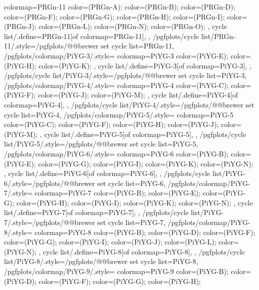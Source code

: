 {{    colormap={PRGn-11}{
      color=(PRGn-A);
      color=(PRGn-B);
      color=(PRGn-D);
      color=(PRGn-F);
      color=(PRGn-G);
      color=(PRGn-H);
      color=(PRGn-I);
      color=(PRGn-J);
      color=(PRGn-L);
      color=(PRGn-N);
      color=(PRGn-O);
    },
    cycle list/.define={PRGn-11}{[of colormap=PRGn-11]},
  },
  /pgfplots/cycle list/PRGn-11/.style={/pgfplots/@@brewer set cycle list={PRGn-11}},
  /pgfplots/colormap/PiYG-3/.style={
    colormap={PiYG-3}{
      color=(PiYG-E);
      color=(PiYG-H);
      color=(PiYG-K);
    },
    cycle list/.define={PiYG-3}{[of colormap=PiYG-3]},
  },
  /pgfplots/cycle list/PiYG-3/.style={/pgfplots/@@brewer set cycle list={PiYG-3}},
  /pgfplots/colormap/PiYG-4/.style={
    colormap={PiYG-4}{
      color=(PiYG-C);
      color=(PiYG-F);
      color=(PiYG-J);
      color=(PiYG-M);
    },
    cycle list/.define={PiYG-4}{[of colormap=PiYG-4]},
  },
  /pgfplots/cycle list/PiYG-4/.style={/pgfplots/@@brewer set cycle list={PiYG-4}},
  /pgfplots/colormap/PiYG-5/.style={
    colormap={PiYG-5}{
      color=(PiYG-C);
      color=(PiYG-F);
      color=(PiYG-H);
      color=(PiYG-J);
      color=(PiYG-M);
    },
    cycle list/.define={PiYG-5}{[of colormap=PiYG-5]},
  },
  /pgfplots/cycle list/PiYG-5/.style={/pgfplots/@@brewer set cycle list={PiYG-5}},
  /pgfplots/colormap/PiYG-6/.style={
    colormap={PiYG-6}{
      color=(PiYG-B);
      color=(PiYG-E);
      color=(PiYG-G);
      color=(PiYG-I);
      color=(PiYG-K);
      color=(PiYG-N);
    },
    cycle list/.define={PiYG-6}{[of colormap=PiYG-6]},
  },
  /pgfplots/cycle list/PiYG-6/.style={/pgfplots/@@brewer set cycle list={PiYG-6}},
  /pgfplots/colormap/PiYG-7/.style={
    colormap={PiYG-7}{
      color=(PiYG-B);
      color=(PiYG-E);
      color=(PiYG-G);
      color=(PiYG-H);
      color=(PiYG-I);
      color=(PiYG-K);
      color=(PiYG-N);
    },
    cycle list/.define={PiYG-7}{[of colormap=PiYG-7]},
  },
  /pgfplots/cycle list/PiYG-7/.style={/pgfplots/@@brewer set cycle list={PiYG-7}},
  /pgfplots/colormap/PiYG-8/.style={
    colormap={PiYG-8}{
      color=(PiYG-B);
      color=(PiYG-D);
      color=(PiYG-F);
      color=(PiYG-G);
      color=(PiYG-I);
      color=(PiYG-J);
      color=(PiYG-L);
      color=(PiYG-N);
    },
    cycle list/.define={PiYG-8}{[of colormap=PiYG-8]},
  },
  /pgfplots/cycle list/PiYG-8/.style={/pgfplots/@@brewer set cycle list={PiYG-8}},
  /pgfplots/colormap/PiYG-9/.style={
    colormap={PiYG-9}{
      color=(PiYG-B);
      color=(PiYG-D);
      color=(PiYG-F);
      color=(PiYG-G);
      color=(PiYG-H);
}}}
